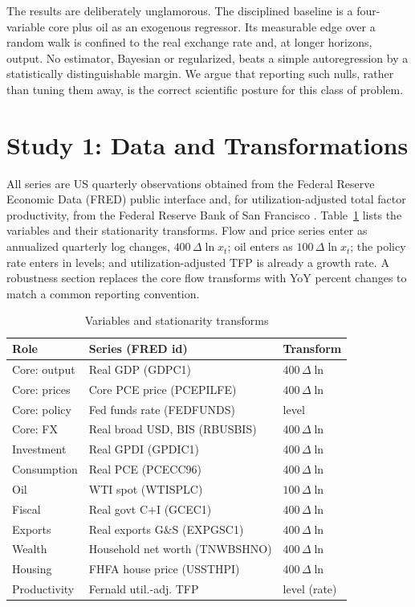 \documentclass[conference]{IEEEtran}
\begin{document}
The results are deliberately unglamorous. The disciplined baseline is a four-variable core plus oil as an exogenous regressor. Its measurable edge over a random walk is confined to the real exchange rate and, at longer horizons, output. No estimator, Bayesian or regularized, beats a simple autoregression by a statistically distinguishable margin. We argue that reporting such nulls, rather than tuning them away, is the correct scientific posture for this class of problem.

\section{Study 1: Data and Transformations}
All series are US quarterly observations obtained from the Federal Reserve Economic Data (FRED) public interface and, for utilization-adjusted total factor productivity, from the Federal Reserve Bank of San Francisco \cite{fernald2014}. Table~\ref{tab:data} lists the variables and their stationarity transforms. Flow and price series enter as annualized quarterly log changes, $400\,\Delta \ln x_t$; oil enters as $100\,\Delta \ln x_t$; the policy rate enters in levels; and utilization-adjusted TFP is already a growth rate. A robustness section replaces the core flow transforms with YoY percent changes to match a common reporting convention.

\begin{table}[t]
\caption{Variables and stationarity transforms}
\label{tab:data}
\centering
\small
\begin{tabular}{@{}lll@{}}
\toprule
Role & Series (FRED id) & Transform \\
\midrule
Core: output & Real GDP (GDPC1) & $400\,\Delta\ln$ \\
Core: prices & Core PCE price (PCEPILFE) & $400\,\Delta\ln$ \\
Core: policy & Fed funds rate (FEDFUNDS) & level \\
Core: FX & Real broad USD, BIS (RBUSBIS) & $400\,\Delta\ln$ \\
Investment & Real GPDI (GPDIC1) & $400\,\Delta\ln$ \\
Consumption & Real PCE (PCECC96) & $400\,\Delta\ln$ \\
Oil & WTI spot (WTISPLC) & $100\,\Delta\ln$ \\
Fiscal & Real govt C+I (GCEC1) & $400\,\Delta\ln$ \\
Exports & Real exports G\&S (EXPGSC1) & $400\,\Delta\ln$ \\
Wealth & Household net worth (TNWBSHNO) & $400\,\Delta\ln$ \\
Housing & FHFA house price (USSTHPI) & $400\,\Delta\ln$ \\
Productivity & Fernald util.-adj. TFP & level (rate) \\
\bottomrule
\end{tabular}
\end{table}
\end{document}
